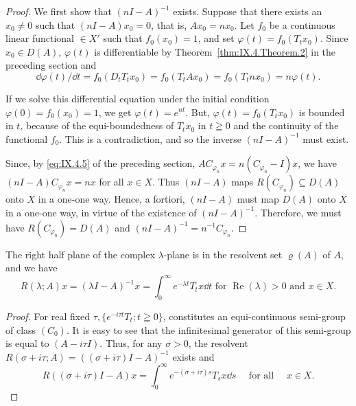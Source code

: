 \begin{proof}
 We first show that $(nI-A)^{-1}$ exists. Suppose that there exists an $x_{0}\neq0$ such that $(nI-A)x_{0}=0$, that is, $Ax_{0}=nx_{0}$. Let $f_{0}$ be a continuous linear functional $\in X'$ such that $f_{0}(x_{0})=1$, and set $\varphi(t)=f_{0}(T_{t}x_{0})$. Since $x_{0}\in D(A)$, $\varphi(t)$ is differentiable by Theorem~\ref{thm:IX.4.Theorem.2} in the preceding section and 
\[
\dd \varphi (t) / \dd t = f _{0} \left(D _{t} T _{t} x _{0}\right) = f _{0} \left(T _{t} A x _{0}\right) = f _{0} \left(T _{t} n x _{0}\right) = n \varphi (t). \]

If we solve this differential equation under the initial condition $\varphi(0)=f_{0}(x_{0})=1$, we get $\varphi(t)=e^{nt}$. But, $\varphi(t)=f_{0}(T_{t}x_{0})$ is bounded in $t$, because of the equi-boundedness of $T_{t}x_{0}$ in $t\geqq0$ and the continuity of the functional $f_{0}$. This is a contradiction, and so the inverse $(nI-A)^{-1}$ must exist. 

Since, by \eqref{eq:IX.4.5} of the preceding section, $A C_{\varphi_n}x = n(C_{\varphi_n} - I)x$, we have $(nI - A)C_{\varphi_n}x = nx$ for all $x \in X$. Thus $(nI - A)$ maps $R(C_{\varphi_n}) \subseteq D(A)$ onto $X$ in a one-one way. Hence, a fortiori, $(nI - A)$ must map $D(A)$ onto $X$ in a one-one way, in virtue of the existence of $(nI - A)^{-1}$. Therefore, we must have $R(C_{\varphi_n}) = D(A)$ and $(nI - A)^{-1} = n^{-1}C_{\varphi_n}$. 
\end{proof}
\begin{corollary}\label{cor:IX.4.Corollary.1} The right half plane of the complex $\lambda$-plane is in the resolvent set $\varrho(A)$ of $A$, and we have 
\begin{equation}\label{eq:IX.4.2}
R (\lambda ; A) x = (\lambda I - A) ^{-1} x = \int_{0} ^{\infty} e ^{- \lambda t} T _{t} x \dd t \text{ for } \operatorname{Re} (\lambda) > 0 \text{ and } x \in X.
\end{equation}
\end{corollary}

\begin{proof}
 For real fixed $\tau, \{e^{-i\tau t} T_t; t \geqq 0\}$, constitutes an equi-continuous semi-group of class $(C_0)$. It is easy to see that the infinitesimal generator of this semi-group is equal to $(A - i\tau I)$. Thus, for any $\sigma > 0$, the resolvent $R(\sigma + i\tau; A) = ((\sigma + i\tau)I - A)^{-1}$ exists and 
\begin{equation}\tag{2'}\label{eq:IX.4.2'}
R \left((\sigma + i \tau) I - A\right) x = \int_{0} ^{\infty} e ^{-(\sigma + i \tau) s} T _{s} x \dd s \quad \text{ for all } \quad x \in X. \end{equation}
\end{proof}

